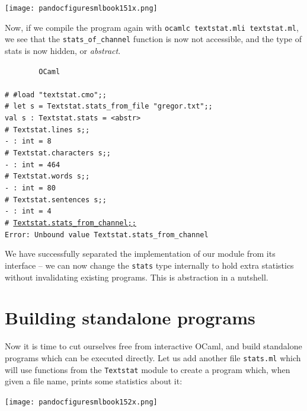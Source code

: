 \documentclass[]{book}
\newcommand{\smspace}{\vspace{4mm}}
\begin{document}
\medskip
\begin{center}
\noindent\texttt{[image: pandocfiguresmlbook151x.png]}
\end{center}
\medskip

Now, if we compile the program again with \texttt{ocamlc textstat.mli textstat.ml}, we see that the \texttt{stats\_of\_channel} function is now not accessible, and the type of stats is now hidden, or \textit{abstract}.

\smspace
\noindent\verb!        OCaml!\\
\noindent\\
\texttt{\# \#load "textstat.cmo";;}\\
\texttt{\# let s = Textstat.stats\_from\_file "gregor.txt";;}\\
\texttt{val s :\ Textstat.stats = <abstr>}\\
\texttt{\# Textstat.lines s;;}\\
\texttt{- :\ int = 8}\\
\texttt{\# Textstat.characters s;;}\\
\texttt{- :\ int = 464}\\
\texttt{\# Textstat.words s;;}\\
\texttt{- :\ int = 80}\\
\texttt{\# Textstat.sentences s;;}\\
\texttt{- :\ int = 4}\\
\texttt{\# }\underline{\verb!Textstat.stats_from_channel;;!}\\
\texttt{Error:\ Unbound value Textstat.stats\_from\_channel}\vphantom{g}
\smspace

\noindent We have successfully separated the implementation of our module from its interface -- we can now change the \texttt{stats} type internally to hold extra statistics without invalidating existing programs. This is abstraction in a nutshell.
 
\section*{Building standalone programs}

Now it is time to cut ourselves free from interactive OCaml, and build standalone programs which can be executed directly. Let us add another file \texttt{stats.ml} which  will use functions from the \texttt{Textstat} module to create a program which, when given a file name, prints some statistics about it:

\medskip
\begin{center}
\noindent\texttt{[image: pandocfiguresmlbook152x.png]}
\end{center}
\medskip
\end{document}
